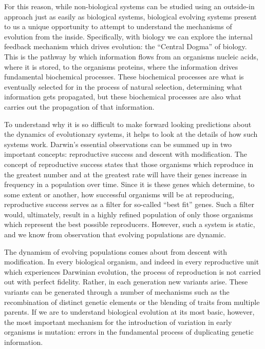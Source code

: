 For this reason, while non-biological systems can be studied using an outside-in approach just as easily as biological systems, biological evolving systems present to us a unique opportunity to attempt to understand the mechanisms of evolution from the inside. Specifically, with biology we can explore the internal feedback mechanism which drives evolution: the ``Central Dogma'' of biology. This is the pathway by which information flows from an organisms nucleic acids, where it is stored, to the organisms proteins, where the information drives fundamental biochemical processes. These biochemical processes are what is eventually selected for in the process of natural selection, determining what information gets propagated, but these biochemical processes are also what carries out the propagation of that information.

To understand why it is so difficult to make forward looking predictions about the dynamics of evolutionary systems, it helps to look at the details of how such systems work. Darwin's essential observations can be summed up in two important concepts: reproductive success and descent with modification. The concept of reproductive success states that those organisms which reproduce in the greatest number and at the greatest rate will have their genes increase in frequency in a population over time. Since it is these genes which determine, to some extent or another, how successful organisms will be at reproducing, reproductive success serves as a filter for so-called ``best fit'' genes. Such a filter would, ultimately, result in a highly refined population of only those organisms which represent the best possible reproducers. However, such a system is static, and we know from observation that evolving populations are dynamic.

The dynamism of evolving populations comes about from descent with modification. In every biological organism, and indeed in every reproductive unit which experiences Darwinian evolution, the process of reproduction is not carried out with perfect fidelity. Rather, in each generation new variants arise. These variants can be generated through a number of mechanisms such as the recombination of distinct genetic elements or the blending of traits from multiple parents. If we are to understand biological evolution at its most basic, however, the most important mechanism for the introduction of variation in early organisms is mutation: errors in the fundamental process of duplicating genetic information.

